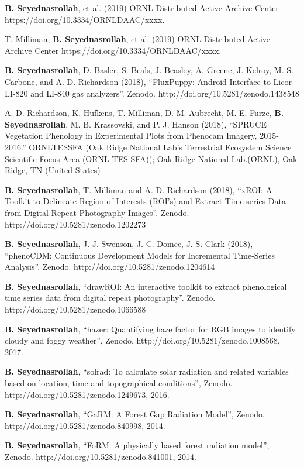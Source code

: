 \documentclass[10pt]{article}
\newenvironment{changemargin}[2]{%
  \begin{list}{}{%
    \setlength{\topsep}{0pt}%
    \setlength{\leftmargin}{#1}%
    \setlength{\rightmargin}{#2}%
    \setlength{\listparindent}{\parindent}%
    \setlength{\itemindent}{\parindent}%
    \setlength{\parsep}{\parskip}%
  }%
  \item[]}{\end{list}
}
\newenvironment{body} {
	\vspace*{-2pt}
	\begin{changemargin}{-0.5in}{-0.5in}
  }
	{\end{changemargin}
}
\begin{document}
\begin{body}

\textbf{B. Seyednasrollah}, et al. (2019) ORNL Distributed Active Archive Center https://doi.org/10.3334/ORNLDAAC/xxxx. 
\\ \medskip

T. Milliman, \textbf{B. Seyednasrollah}, et al. (2019) ORNL Distributed Active Archive Center https://doi.org/10.3334/ORNLDAAC/xxxx. 
\\ \medskip

\textbf{B. Seyednasrollah}, D. Basler, S. Beals, J. Beasley, A. Greene, J. Kelroy, M. S. Carbone, and A. D. Richardson (2018), ``FluxPuppy: Android Interface to Licor LI-820 and LI-840 gas analyzers''. Zenodo. http://doi.org/10.5281/zenodo.1438548\\ \medskip

A. D. Richardson, K. Hufkens, T. Milliman, D. M. Aubrecht, M. E. Furze, \textbf{B. Seyednasrollah}, M. B. Krassovski, and P. J. Hanson (2018), ``SPRUCE Vegetation Phenology in Experimental Plots from Phenocam Imagery, 2015-2016.'' ORNLTESSFA (Oak Ridge National Lab's Terrestrial Ecosystem Science Scientific Focus Area (ORNL TES SFA)); Oak Ridge National Lab.(ORNL), Oak Ridge, TN (United States)\\ \medskip

\textbf{B. Seyednasrollah}, T. Milliman and A. D. Richardson (2018),  ``xROI: A Toolkit to Delineate Region of Interests (ROI's) and Extract Time-series Data from Digital Repeat Photography Images''. Zenodo. http://doi.org/10.5281/zenodo.1202273\\ \medskip

\textbf{B. Seyednasrollah}, J. J. Swenson, J. C. Domec, J. S. Clark (2018),  ``phenoCDM: Continuous Development Models for Incremental Time-Series Analysis''. Zenodo. http://doi.org/10.5281/zenodo.1204614\\ \medskip

\textbf{B. Seyednasrollah},  ``drawROI: An interactive toolkit to extract phenological time series data from digital repeat photography''. Zenodo. http://doi.org/10.5281/zenodo.1066588\\ \medskip

   \textbf{B. Seyednasrollah}, ``hazer: Quantifying haze factor for RGB images to identify cloudy and foggy weather'', Zenodo. http://doi.org/10.5281/zenodo.1008568, 2017. \\ \medskip

   \textbf{B. Seyednasrollah}, ``solrad: To calculate solar radiation and related variables based on location, time and topographical conditions'', Zenodo. http://doi.org/10.5281/zenodo.1249673, 2016. \\ \medskip

   \textbf{B. Seyednasrollah}, ``GaRM: A Forest Gap Radiation Model'', Zenodo. http://doi.org/10.5281/zenodo.840998, 2014. \\ \medskip

   \textbf{B. Seyednasrollah}, ``FoRM: A physically based forest radiation model'', Zenodo. http://doi.org/10.5281/zenodo.841001, 2014. \\
   \medskip

\end{body}
\end{document}
